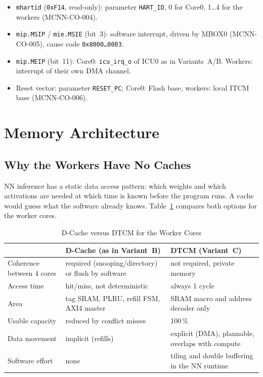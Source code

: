 \begin{itemize}
  \item \texttt{mhartid} (\texttt{0xF14}, read-only): parameter
    \texttt{HART\_ID}, 0 for Core0, 1\ldots4 for the workers (MCNN-CO-004).
  \item \texttt{mip.MSIP} / \texttt{mie.MSIE} (bit~3): software interrupt,
    driven by MBOX0 (MCNN-CO-005), cause code \texttt{0x8000\ldots0003}.
  \item \texttt{mip.MEIP} (bit~11): Core0: \texttt{icu\_irq\_o} of ICU0 as in
    Variants~A/B. Workers: interrupt of their own DMA channel.
  \item Reset vector: parameter \texttt{RESET\_PC}; Core0: Flash base,
    workers: local ITCM base (MCNN-CO-006).
\end{itemize}

\section{Memory Architecture}
\label{sec:mcnnmem}

\subsection{Why the Workers Have No Caches}
\label{subsec:mcnnnocache}

NN inference has a static data access pattern: which weights and which
activations are needed at which time is known before the program runs.
A cache would guess what the software already knows. Table~\ref{tab:mcnncachetcm}
compares both options for the worker cores.

\begin{table}[H]
\caption{D-Cache versus DTCM for the Worker Cores}
\label{tab:mcnncachetcm}
\centering
{\footnotesize
\begin{tabularx}{\textwidth}{|l |X |X|}
  \hline
   & D-Cache (as in Variant~B) & DTCM (Variant~C) \\
  \hline
  \hline
  Coherence between 4 cores & required (snooping/directory) or flush by software & not required, private memory \\
  \hline
  Access time & hit/miss, not deterministic & always 1 cycle \\
  \hline
  Area & tag SRAM, PLRU, refill FSM, AXI4 master & SRAM macro and address decoder only \\
  \hline
  Usable capacity & reduced by conflict misses & 100\,\% \\
  \hline
  Data movement & implicit (refills) & explicit (DMA), plannable, overlaps with compute \\
  \hline
  Software effort & none & tiling and double buffering in the NN runtime \\
  \hline
\end{tabularx}}
\end{table}

